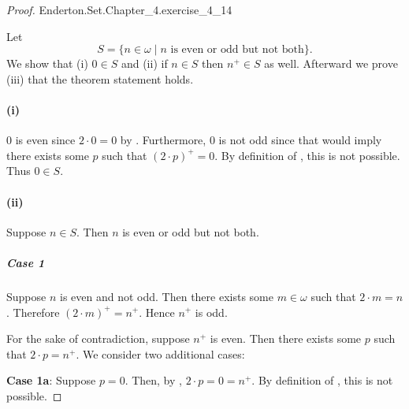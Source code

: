 \documentclass{report}
\begin{document}
\begin{proof}

    {Enderton.Set.Chapter\_4.exercise\_4\_14}

  Let $$S = \{n \in \omega \mid n \text{ is even or odd but not both}\}.$$
  We show that (i) $0 \in S$ and (ii) if $n \in S$ then $n^+ \in S$ as well.
  Afterward we prove (iii) that the theorem statement holds.

  \paragraph{(i)}%

    $0$ is even since $2 \cdot 0 = 0$ by .
    Furthermore, $0$ is not odd since that would imply there exists some
      $p$ such that $(2 \cdot p)^+ = 0$.
    By definition of , this is not possible.
    Thus $0 \in S$.

  \paragraph{(ii)}%

    Suppose $n \in S$.
    Then $n$ is even or odd but not both.

    \subparagraph{Case 1}%

      Suppose $n$ is even and not odd.
      Then there exists some $m \in \omega$ such that $2 \cdot m = n$.
      Therefore $(2 \cdot m)^+ = n^+$.
      Hence $n^+$ is odd.

      For the sake of contradiction, suppose $n^+$ is even.
      Then there exists some $p$ such that $2 \cdot p = n^+$.
      We consider two additional cases:

      \vspace{8pt}\quad
      \textbf{Case 1a}: Suppose $p = 0$.
      Then, by , $2 \cdot p = 0 = n^+$.
      By definition of , this is not possible. 


\end{proof}
\end{document}
